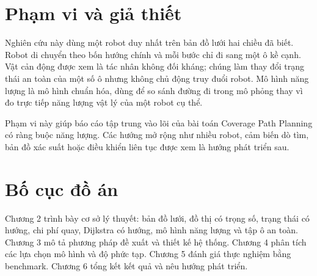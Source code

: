 \documentclass[../DoAn.tex]{subfiles}
\begin{document}
\section{Phạm vi và giả thiết}

Nghiên cứu này dùng một robot duy nhất trên bản đồ lưới hai chiều đã biết. Robot di chuyển theo bốn hướng chính và mỗi bước chỉ đi sang một ô kề cạnh. Vật cản động được xem là tác nhân không đối kháng; chúng làm thay đổi trạng thái an toàn của một số ô nhưng không chủ động truy đuổi robot. Mô hình năng lượng là mô hình chuẩn hóa, dùng để so sánh đường đi trong mô phỏng thay vì đo trực tiếp năng lượng vật lý của một robot cụ thể.

Phạm vi này giúp báo cáo tập trung vào lõi của bài toán Coverage Path Planning có ràng buộc năng lượng. Các hướng mở rộng như nhiều robot, cảm biến dò tìm, bản đồ xác suất hoặc điều khiển liên tục được xem là hướng phát triển sau.

\section{Bố cục đồ án}

Chương 2 trình bày cơ sở lý thuyết: bản đồ lưới, đồ thị có trọng số, trạng thái có hướng, chi phí quay, Dijkstra có hướng, mô hình năng lượng và tập ô an toàn. Chương 3 mô tả phương pháp đề xuất và thiết kế hệ thống. Chương 4 phân tích các lựa chọn mô hình và độ phức tạp. Chương 5 đánh giá thực nghiệm bằng benchmark. Chương 6 tổng kết kết quả và nêu hướng phát triển.
\end{document}
